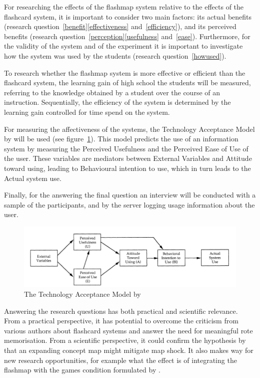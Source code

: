 For researching the effects of the flashmap system relative to the effects of the flashcard system, it is important to consider two main factors: its actual benefits (research question~\ref{benefit}\ref{effectiveness} and~\ref{efficiency}), and its perceived benefits (research question~\ref{perception}\ref{usefulness} and~\ref{ease}). Furthermore, for the validity of the system and of the experiment it is important to investigate how the system was used by the students (research question~\ref{howused}).

To research whether the flashmap system is more effective or efficient than the flashcard system, the learning gain of high school the students will be measured, referring to the knowledge obtained by a student over the course of an instruction. Sequentially, the efficiency of the system is determined by the learning gain controlled for time spend on the system.

For measuring the affectiveness of the systems, the Technology Acceptance Model by  will be used (see figure~\ref{fig:tam}). This model predicts the use of an information system by measuring the Perceived Usefulness and the Perceived Ease of Use of the user. These variables are mediators between External Variables and Attitude toward using, leading to Behavioural intention to use, which in turn leads to the Actual system use.

Finally, for the answering the final question an interview will be conducted with a sample of the participants, and by the server logging usage information about the user.

\begin{figure}
    \centering
    \includegraphics[width=\textwidth]{img/tam}
    \caption{The Technology Acceptance Model by \protect{}}
    \label{fig:tam}
\end{figure}

Answering the research questions has both practical and scientific relevance. From a practical perspective, it has potential to overcome the criticism from various authors about flashcard systems and answer the need for meaningful rote memorisation. From a scientific perspective, it could confirm the hypothesis by  that an expanding concept map might mitigate map shock. It also makes way for new research opportunities, for example what the effect is of integrating the flashmap with the games condition formulated by . 

